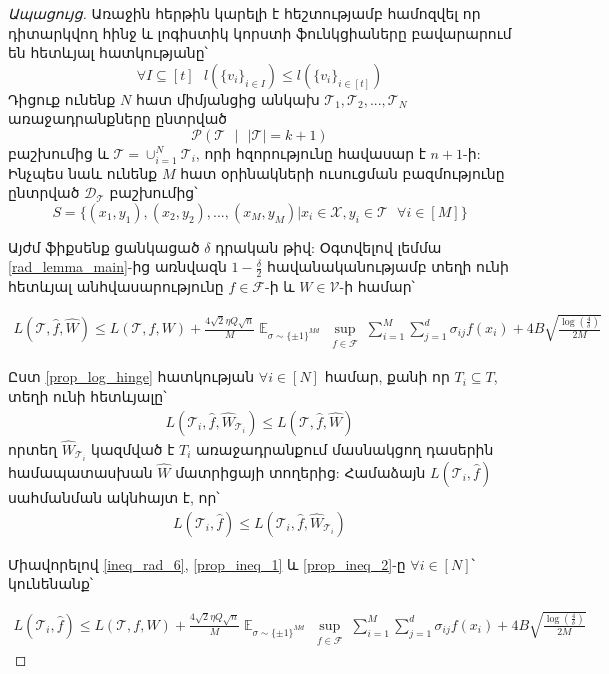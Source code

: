 \documentclass[12pt]{article}
\DeclareMathOperator*{\E}{\mathbb{E}}
\begin{document}
\begin{proof}[Ապացույց] Առաջին հերթին կարելի է հեշտությամբ համոզվել որ դիտարկվող հինջ և լոգիստիկ կորստի ֆունկցիաները բավարարում են հետևյալ հատկությանը՝
\begin{equation}
\label{prop_log_hinge}
\forall I \subseteq [t] \text{   }   l(\{v_i\}_{i\in I}) \leq l(\{v_i\}_{i \in [t]})
\end{equation}
Դիցուք ունենք $N$ հատ միմյանցից անկախ $\mathcal{T}_1,\mathcal{T}_2, ...,\mathcal{T}_N$  առաջադրանքները ընտրված 
$$\mathcal{P}(\mathcal{T} \text{ } |\text{ }  |\mathcal{T}| = k +1)$$
բաշխումից և $\mathcal{T} = \cup_{i=1}^N\mathcal{T}_i$, որի հզորությունը հավասար է $n+1$-ի: Ինչպես նաև ունենք $M$ հատ օրինակների ուսուցման բազմությունը ընտրված $\mathcal{D_\mathcal{T}}$ բաշխումից՝
$$S = \{(x_1, y_1), (x_2, y_2), ..., (x_M, y_M) | x_i \in \mathcal{X}, y_i \in \mathcal{T} \text{ }\forall i \in[M]\}$$

\noindent Այժմ ֆիքսենք ցանկացած $\delta$ դրական թիվ: Օգտվելով լեմմա \ref{rad_lemma_main}-ից առնվազն $1-\frac{\delta}{2}$ հավանականությամբ տեղի ունի հետևյալ անհվասարությունը $f \in \mathcal{F}$-ի և $W \in \mathcal{V}$-ի համար՝

\begin{align}
\label{ineq_rad_6}
L(\mathcal{T}, \hat{f}, \hat{W}) \leq  L(\mathcal{T}, f, W) + \frac{4\sqrt{2} \eta Q\sqrt{n}}{M} \E_{\sigma \sim \{\pm1\}^{Md}} \sup_{\substack{ f  \in \mathcal{F}  }}\sum_{i=1}^M \sum_{j=1}^d \sigma_{ij}f(x_i)+    4B\sqrt{\frac{\log \left( \frac{4}{\delta} \right)}{2M}}
\end{align}

\noindent Ըստ \ref{prop_log_hinge} հատկության $\forall i \in [N]$ համար, քանի որ $T_i \subseteq T$, տեղի ունի հետևյալը՝
\begin{align}
\label{prop_ineq_1}
L(\mathcal{T}_i, \hat{f}, \hat{W}_{\mathcal{T}_i}) \leq L(\mathcal{T}, \hat{f}, \hat{W} )
\end{align}
 որտեղ $\hat{W}_{\mathcal{T}_i}$ կազմված է $T_i$ առաջադրանքում մասնակցող դասերին համապատասխան  $\hat{W}$ մատրիցայի տողերից: Համաձայն $L(\mathcal{T}_i, \hat{f})$ սահմանման ակնհայտ է, որ՝
\begin{align}
\label{prop_ineq_2}
L(\mathcal{T}_i, \hat{f}) \leq L(\mathcal{T}_i, \hat{f}, \hat{W}_{\mathcal{T}_i})
\end{align}

Միավորելով \ref{ineq_rad_6}, \ref{prop_ineq_1}  և \ref{prop_ineq_2}-ը $\forall i \in [N]$՝ կունենանք՝


\begin{align}
\label{ineq_rad_7}
L(\mathcal{T}_i, \hat{f}) \leq  L(\mathcal{T}, f, W) + \frac{4\sqrt{2} \eta Q\sqrt{n}}{M} \E_{\sigma \sim \{\pm1\}^{Md}} \sup_{\substack{ f  \in \mathcal{F}  }}\sum_{i=1}^M \sum_{j=1}^d \sigma_{ij}f(x_i)+    4B\sqrt{\frac{\log \left( \frac{4}{\delta} \right)}{2M}}
\end{align}


\end{proof}
\end{document}
